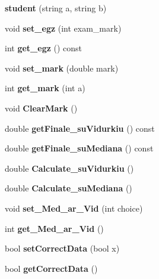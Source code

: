 \begin{DoxyCompactItemize}
\item 
\mbox{\label{classstudent_a8bea5b694cb3edb84d917ce7ab30eb99}} 
{\bfseries student} (string a, string b)
\item 
\mbox{\label{classstudent_a30c5874c78360764a487eef8c5017a27}} 
void {\bfseries set\+\_\+egz} (int exam\+\_\+mark)
\item 
\mbox{\label{classstudent_a6f6989cb8a935d768aa67d7d0f2fb09c}} 
int {\bfseries get\+\_\+egz} () const
\item 
\mbox{\label{classstudent_ab8fd85e628c1deba431d18adb16f2981}} 
void {\bfseries set\+\_\+mark} (double mark)
\item 
\mbox{\label{classstudent_a4482426a83c262f8f1b044e574064a24}} 
int {\bfseries get\+\_\+mark} (int a)
\item 
\mbox{\label{classstudent_a151156feb1c8bdaeaca3de30eae24819}} 
void {\bfseries Clear\+Mark} ()
\item 
\mbox{\label{classstudent_a7b5992c1caeba57a85ff2f31c7ace1f6}} 
double {\bfseries get\+Finale\+\_\+su\+Vidurkiu} () const
\item 
\mbox{\label{classstudent_a232d03ab9b283b37bec4defe34436bdd}} 
double {\bfseries get\+Finale\+\_\+su\+Mediana} () const
\item 
\mbox{\label{classstudent_ab3438b902059e4d7556d6d63495c0820}} 
double {\bfseries Calculate\+\_\+su\+Vidurkiu} ()
\item 
\mbox{\label{classstudent_adebe51d374b0aeeef42cb2a4ab1cd535}} 
double {\bfseries Calculate\+\_\+su\+Mediana} ()
\item 
\mbox{\label{classstudent_a33257cfb71eac55f8858ba1b6dbeb5a6}} 
void {\bfseries set\+\_\+\+Med\+\_\+ar\+\_\+\+Vid} (int choice)
\item 
\mbox{\label{classstudent_a847ed657fa6ffc4226fa1e0d1f8b9a37}} 
int {\bfseries get\+\_\+\+Med\+\_\+ar\+\_\+\+Vid} ()
\item 
\mbox{\label{classstudent_a9d1f5393d8b7e09affbeb10cf59ef9e6}} 
bool {\bfseries set\+Correct\+Data} (bool x)
\item 
\mbox{\label{classstudent_aae3248995a2030efa2f3f47dfdc13706}} 
bool {\bfseries get\+Correct\+Data} ()
\end{DoxyCompactItemize}
